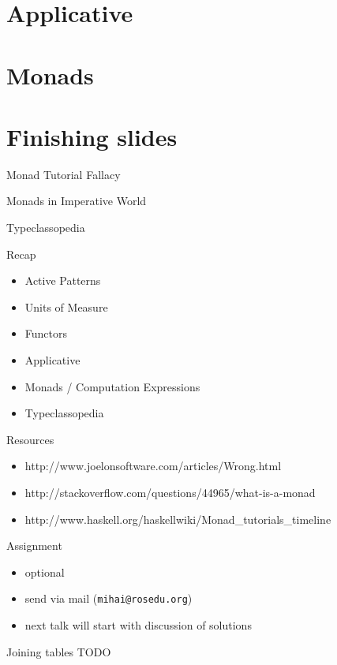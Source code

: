 \documentclass{beamer}
\begin{document}
\section{Applicative}
\frame{\tableofcontents[currentsection]}

\section{Monads}
\frame{\tableofcontents[currentsection]}

\section{Finishing slides}
\frame{\tableofcontents[currentsection]}

\begin{frame}{Monad Tutorial Fallacy}
\end{frame}

\begin{frame}{Monads in Imperative World}
\end{frame}

\begin{frame}{Typeclassopedia}
\end{frame}

\begin{frame}{Recap}
  \begin{itemize}[<+->]
    \item Active Patterns
    \item Units of Measure
    \item Functors
    \item Applicative
    \item Monads / Computation Expressions
    \item Typeclassopedia
  \end{itemize}
\end{frame}

\begin{frame}{Resources}
  \begin{itemize}
    \item http://www.joelonsoftware.com/articles/Wrong.html
    \item http://stackoverflow.com/questions/44965/what-is-a-monad
    \item http://www.haskell.org/haskellwiki/Monad\_tutorials\_timeline
  \end{itemize}
\end{frame}

\begin{frame}[fragile]{Assignment}
  \begin{itemize}
    \item optional
    \item send via mail (\texttt{mihai@rosedu.org})
    \item next talk will start with discussion of solutions
  \end{itemize}
  \pause
  \begin{block}{Joining tables}
  TODO
  \end{block}
\end{frame}
\end{document}
